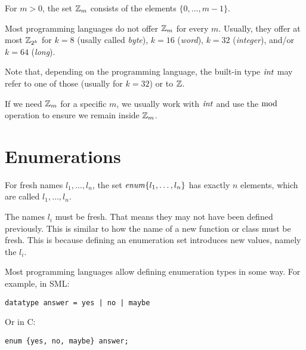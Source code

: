For $m>0$, the set $\mathbb{Z}_m$ consists of the elements $\{0,\ldots,m-1\}$.

Most programming languages do not offer $\mathbb{Z}_m$ for every $m$.
Usually, they offer at most $\mathbb{Z}_{2^k}$ for $k=8$ (usally called \emph{byte}), $k=16$ (\emph{word}), $k=32$ (\emph{integer}), and/or $k=64$ (\emph{long}).

Note that, depending on the programming language, the built-in type $\mathit{int}$ may refer to one of those (usually for $k=32$) or to $\mathbb{Z}$.

If we need $\mathbb{Z}_m$ for a specific $m$, we usually work with $\mathit{int}$ and use the $\mathop{\mathrm{mod}}$ operation to ensure we remain inside $\mathbb{Z}_m$.

\section{Enumerations}

For fresh names $l_1,\ldots,l_n$, the set $\mathit{enum}\{l_1,\ldots,l_n\}$ has exactly $n$ elements, which are called $l_1,\ldots,l_n$.

The names $l_i$ must be fresh.
That means they may not have been defined previously.
This is similar to how the name of a new function or class must be fresh.
This is because defining an enumeration set introduces new values, namely the $l_i$.

Most programming languages allow defining enumeration types in some way.
For example, in SML:

\begin{lstlisting}
datatype answer = yes | no | maybe
\end{lstlisting}

Or in C:

\begin{lstlisting}
enum {yes, no, maybe} answer;
\end{lstlisting}